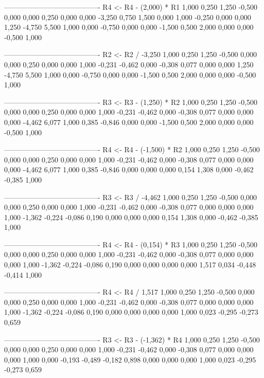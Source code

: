 \documentclass[12pt]{article}
\begin{document}
\begin{enumerate}
\begin{keluaran}
----------------------------------------
R4 <- R4 - (2,000) * R1
1,000   0,250   1,250   -0,500  0,000   0,000   0,250   0,000
0,000   -3,250  0,750   1,500   0,000   1,000   -0,250  0,000
0,000   1,250   -4,750  5,500   1,000   0,000   -0,750  0,000
0,000   -1,500  0,500   2,000   0,000   0,000   -0,500  1,000

----------------------------------------
R2 <- R2 / -3,250
1,000   0,250   1,250   -0,500  0,000   0,000   0,250   0,000
0,000   1,000   -0,231  -0,462  0,000   -0,308  0,077   0,000
0,000   1,250   -4,750  5,500   1,000   0,000   -0,750  0,000
0,000   -1,500  0,500   2,000   0,000   0,000   -0,500  1,000

----------------------------------------
R3 <- R3 - (1,250) * R2
1,000   0,250   1,250   -0,500  0,000   0,000   0,250   0,000
0,000   1,000   -0,231  -0,462  0,000   -0,308  0,077   0,000
0,000   0,000   -4,462  6,077   1,000   0,385   -0,846  0,000
0,000   -1,500  0,500   2,000   0,000   0,000   -0,500  1,000

----------------------------------------
R4 <- R4 - (-1,500) * R2
1,000   0,250   1,250   -0,500  0,000   0,000   0,250   0,000
0,000   1,000   -0,231  -0,462  0,000   -0,308  0,077   0,000
0,000   0,000   -4,462  6,077   1,000   0,385   -0,846  0,000
0,000   0,000   0,154   1,308   0,000   -0,462  -0,385  1,000

----------------------------------------
R3 <- R3 / -4,462
1,000   0,250   1,250   -0,500  0,000   0,000   0,250   0,000
0,000   1,000   -0,231  -0,462  0,000   -0,308  0,077   0,000
0,000   0,000   1,000   -1,362  -0,224  -0,086  0,190   0,000
0,000   0,000   0,154   1,308   0,000   -0,462  -0,385  1,000

----------------------------------------
R4 <- R4 - (0,154) * R3
1,000   0,250   1,250   -0,500  0,000   0,000   0,250   0,000
0,000   1,000   -0,231  -0,462  0,000   -0,308  0,077   0,000
0,000   0,000   1,000   -1,362  -0,224  -0,086  0,190   0,000
0,000   0,000   0,000   1,517   0,034   -0,448  -0,414  1,000

----------------------------------------
R4 <- R4 / 1,517
1,000   0,250   1,250   -0,500  0,000   0,000   0,250   0,000
0,000   1,000   -0,231  -0,462  0,000   -0,308  0,077   0,000
0,000   0,000   1,000   -1,362  -0,224  -0,086  0,190   0,000
0,000   0,000   0,000   1,000   0,023   -0,295  -0,273  0,659

----------------------------------------
R3 <- R3 - (-1,362) * R4
1,000   0,250   1,250   -0,500  0,000   0,000   0,250   0,000
0,000   1,000   -0,231  -0,462  0,000   -0,308  0,077   0,000
0,000   0,000   1,000   0,000   -0,193  -0,489  -0,182  0,898
0,000   0,000   0,000   1,000   0,023   -0,295  -0,273  0,659


\end{keluaran}
\end{enumerate}
\end{document}
